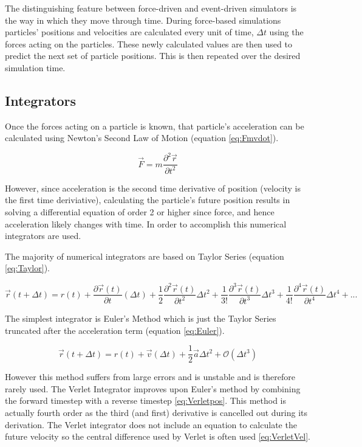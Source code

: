 \documentclass[12pt]{UoAthesis}
\begin{document}
The distinguishing feature between force-driven and event-driven
simulators is the way in which they move through time.  During
force-based simulations particles' positions and velocities are
calculated every unit of time, $\Delta t$ using the forces acting on
the particles.  These newly calculated values are then used to predict
the next set of particle positions.  This is then repeated over the
desired simulation time.

\subsection{Integrators}
Once the forces acting on a particle is known, that particle's
acceleration can be calculated using Newton's Second Law of Motion
(equation \ref{eq:Fmvdot}).

\begin{equation}
  \vec{F} =  m \frac{\partial^2 \vec{r}}{\partial t^2} \label{eq:Fmvdot}
\end{equation}

However, since acceleration is the second time derivative of position
(velocity is the first time deriviative), calculating the particle's
future position results in solving a differential equation of order 2
or higher since force, and hence acceleration likely changes with
time.  In order to accomplish this numerical integrators are used.

The majority of numerical integrators are based on Taylor Series
(equation \ref{eq:Taylor}).

\begin{equation}
  \vec{r}(t+\Delta t) = r(t) + \frac{\partial \vec{r}(t)}{\partial t}(\Delta t) + \frac{1}{2}\frac{\partial^2 \vec{r}(t)}{\partial t^2}\Delta t^2 + \frac{1}{3!}\frac{\partial^3 \vec{r}(t)}{\partial t^3}\Delta t^3 + \frac{1}{4!}\frac{\partial^4 \vec{r}(t)}{\partial t^4}\Delta t^4 + ... \label{eq:Taylor}
\end{equation}

The simplest integrator is Euler's Method which is just the Taylor
Series truncated after the acceleration term (equation
\ref{eq:Euler}).

\begin{equation}
  \vec{r}(t+\Delta t) = r(t) + \vec{v}(\Delta t) + \frac{1}{2}\vec{a}\Delta t^2 + \mathcal{O}(\Delta t^3) \label{eq:Euler}
\end{equation}

However this method suffers from large errors and is unstable
\cite{Haile1997} and is therefore rarely used. The Verlet Integrator
\cite{Verlet1967} improves upon Euler's method by combining the
forward timestep with a reverse timestep \eqref{eq:Verletpos}.  This
method is actually fourth order as the third (and first) derivative is
cancelled out during its derivation.  The Verlet integrator does not
include an equation to calculate the future velocity so the central
difference used by Verlet is often used \eqref{eq:VerletVel}.
\end{document}
